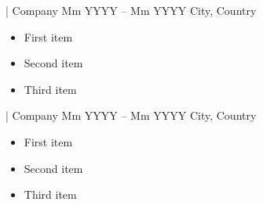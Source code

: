 \documentclass[10pt,a4paper,ragged2e,withhyper]{altacv}
\begin{document}
\begin{paracol}{2}
                {| 
                {Company} %
                }
                {Mm YYYY -- Mm YYYY} %
                {City, Country} %
                \begin{itemize}
                        \item {First item} %
                        \item {Second item} %
                        \item {Third item} %
                \end{itemize}
                \divider
                {| 
                {Company} %
                }
                {Mm YYYY -- Mm YYYY} %
                {City, Country} %
                \begin{itemize}
                        \item {First item} %
                        \item {Second item} %
                        \item {Third item} %
                \end{itemize}
                \divider
        

\end{paracol}
\end{document}
